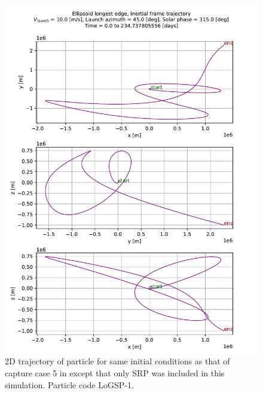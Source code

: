 \begin{figure}[htb]
\centering
\captionsetup{justification=centering}
\includegraphics[angle=90, width=\linewidth, height=\textheight, keepaspectratio=true]{longest_edge_perturbations/3.2Density_1cmSize/10ms_45Azimuth_315SolarPhase/noSTBE_2d_trajectory_inertialFrame.pdf}
\caption{2D trajectory of particle for same initial conditions as that of capture case 5 in  except that only \gls{SRP} was included in this simulation. Particle code LoGSP-1.}
\label{fig:LoGSP_1_capture_case_5_2d_inertialTrajectory_noSTBE}
\end{figure}
\FloatBarrier
